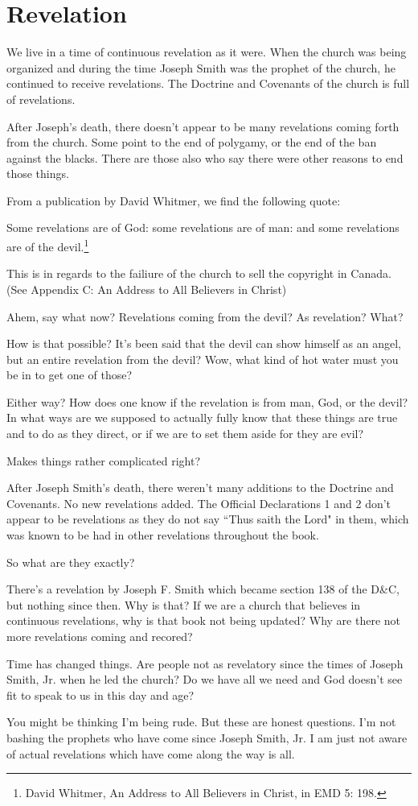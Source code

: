 \chapter{Revelation}

We live in a time of continuous revelation as it were. When the church was
being organized and during the time Joseph Smith was the prophet of the church,
he continued to receive revelations. The Doctrine and Covenants of the church
is full of revelations.

After Joseph's death, there doesn't appear to be many revelations coming forth
from the church. Some point to the end of polygamy, or the end of the ban 
against the blacks. There are those also who say there were other reasons
to end those things.

From a publication by David Whitmer, we find the following quote:

\begin{displayquote}
Some revelations are of God: 
some revelations are of man: 
and some revelations are of the devil.\footnote{David Whitmer, 
An Address to All Believers in Christ, in EMD 5: 198.}
\end{displayquote}

This is in regards to the failiure of the church to sell the copyright in
Canada. (See Appendix C: An Address to All Believers in Christ)

Ahem, say what now? Revelations coming from the devil? As revelation? What?

How is that possible? It's been said that the devil can show himself as an 
angel, but an entire revelation from the devil? Wow, what kind of hot water
must you be in to get one of those?

Either way? How does one know if the revelation is from man, God, or the devil?
In what ways are we supposed to actually fully know that these things are
true and to do as they direct, or if we are to set them aside for they are evil?

Makes things rather complicated right?

After Joseph Smith's death, there weren't many additions to the Doctrine and
Covenants. No new revelations added. The Official Declarations 1 and 2 don't
appear to be revelations as they do not say ``Thus saith the Lord" in them,
which was known to be had in other revelations throughout the book.

So what are they exactly?

There's a revelation by Joseph F. Smith which became section 138 of the D\&C,
but nothing since then. Why is that? If we are a church that believes in
continuous revelations, why is that book not being updated? Why are there
not more revelations coming and recored?

Time has changed things. Are people not as revelatory since the times of
Joseph Smith, Jr. when he led the church? Do we have all we need and God doesn't
see fit to speak to us in this day and age?

You might be thinking I'm being rude. But these are honest questions. I'm not
bashing the prophets who have come since Joseph Smith, Jr. I am just not aware
of actual revelations which have come along the way is all.